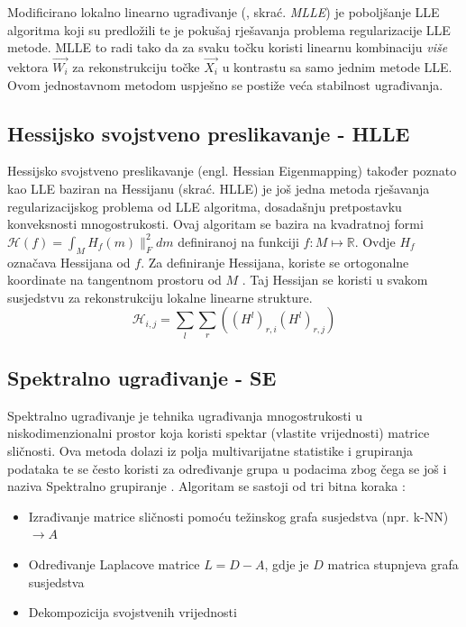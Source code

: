 \documentclass[times, utf8, diplomski]{fer}
\begin{document}
Modificirano lokalno linearno ugrađivanje (, skrać. \emph{MLLE}) je poboljšanje LLE algoritma koji su predložili \cite{zhang2007mlle} te je pokušaj rješavanja problema regularizacije LLE metode. MLLE to radi tako da za svaku točku koristi linearnu kombinaciju \emph{više} vektora $\vec{W_{i}}$ za rekonstrukciju točke $\vec{X_i}$ u kontrastu sa samo jednim metode LLE. Ovom jednostavnom metodom uspješno se postiže veća stabilnost ugrađivanja.

\subsection{Hessijsko svojstveno preslikavanje - HLLE}

Hessijsko svojstveno preslikavanje (engl. Hessian Eigenmapping) također poznato kao LLE baziran na Hessijanu (skrać. HLLE) je još jedna metoda rješavanja regularizacijskog problema od LLE algoritma, dosadašnju pretpostavku konveksnosti mnogostrukosti. Ovaj algoritam se bazira na kvadratnoj formi $\mathcal{H}(f) = \int_M H_f(m)\|_F^2 dm$ definiranoj na funkciji $f: M \mapsto \mathbb{R}$. Ovdje $H_f$ označava Hessijana od $f$. Za definiranje Hessijana, koriste se ortogonalne koordinate na tangentnom prostoru od $M$ \citep{Donoho5591}. Taj Hessijan se koristi u svakom susjedstvu za rekonstrukciju lokalne linearne strukture.
\begin{equation}
    \mathcal{H}_{i,j} = \sum_l \sum_r ((H^l)_{r,i}(H^l)_{r,j})
\end{equation}


\subsection{Spektralno ugrađivanje - SE}
Spektralno ugrađivanje  je tehnika ugrađivanja mnogostrukosti u niskodimenzionalni prostor koja koristi spektar (vlastite vrijednosti) matrice sličnosti. Ova metoda dolazi iz polja multivarijatne statistike i grupiranja podataka te se često koristi za određivanje  grupa u podacima zbog čega se još i naziva Spektralno grupiranje . Algoritam se sastoji od tri bitna koraka \citep{belkin2003laplacian}:
\begin{itemize}
    \item Izrađivanje matrice sličnosti pomoću težinskog grafa susjedstva (npr. k-NN) $\rightarrow A$
    \item Određivanje Laplacove matrice $L = D - A$, gdje je $D$ matrica stupnjeva grafa susjedstva
    \item Dekompozicija svojstvenih vrijednosti 
\end{itemize}
\end{document}

